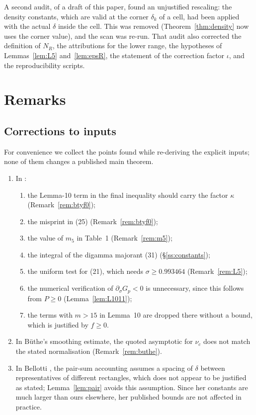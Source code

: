 \documentclass[11pt]{amsart}
\numberwithin{equation}{section}
\theoremstyle{definition}
\theoremstyle{remark}
\begin{document}
A second audit, of a draft of this paper, found an unjustified rescaling: the density constants, which are valid at the corner $\delta_k$ of a cell, had been applied with the actual $\delta$ inside the cell.
This was removed (Theorem~\ref{thm:density} now uses the corner value), and the scan was re-run.
That audit also corrected the definition of $N_R$, the attributions for the lower range, the hypotheses of Lemmas~\ref{lem:L5} and~\ref{lem:epsR}, the statement of the correction factor $\iota$, and the reproducibility scripts.
\section{Remarks}\label{sec:remarks}

\subsection{Corrections to inputs}
For convenience we collect the points found while re-deriving the explicit inputs; none of them changes a published main theorem.
\begin{enumerate}
\item In \cite{BTY}:
  \begin{enumerate}
  \item the Lemma-10 term in the final inequality should carry the factor $\kappa$ (Remark~\ref{rem:btyf0});
  \item the misprint in (25) (Remark~\ref{rem:btyf0});
  \item the value of $m_5$ in Table~1 (Remark~\ref{rem:m5});
  \item the integral of the digamma majorant (31) (\S\ref{ss:constants});
  \item the uniform test for (21), which needs $\sigma \ge 0.993464$ (Remark~\ref{rem:L5});
  \item the numerical verification of $\partial_\sigma G_p < 0$ is unnecessary, since this follows from $P \ge 0$ (Lemma~\ref{lem:L1011});
  \item the terms with $m > 15$ in Lemma~10 are dropped there without a bound, which is justified by $f\ge0$.
  \end{enumerate}
\item In B\"uthe's smoothing estimate, the quoted asymptotic for $\nu_c$ does not match the stated normalisation (Remark~\ref{rem:buthe}).
\item In Bellotti \cite{Bellotti}, the pair-sum accounting \cite[(4.11)]{Bellotti} assumes a spacing of $\delta$ between representatives of different rectangles, which does not appear to be justified as stated; Lemma~\ref{lem:pair} avoids this assumption.
  Since her constants are much larger than ours elsewhere, her published bounds are not affected in practice.
\end{enumerate}
\end{document}
